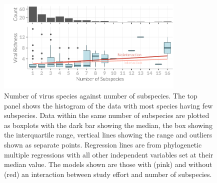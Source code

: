 		
		























\begin{knitrout}\footnotesize
{}\color{fgcolor}\begin{figure}[t]

{\centering \includegraphics[width=0.8\textwidth]{figure/boxplot-1} 

}

\caption[Number of virus species against number of subspecies]{Number of virus species against number of subspecies. 		
The top panel shows the histogram of the data with most species having few subspecies.		
Data within the same number of subspecies are plotted as boxplots with the dark bar showing the median, the box showing the interquartile range, vertical lines showing the range and outliers shown as separate points.		
Regression lines are from phylogenetic multiple regressions with all other independent variables set at their median value.		
The models shown are those with (pink) and without (red) an interaction between study effort and number of subspecies.		
}\label{fig:boxplot}
\end{figure}


\end{knitrout}



